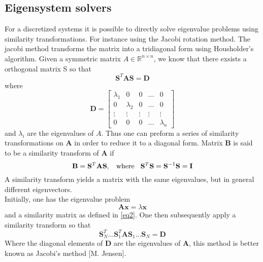 \documentclass[%
reprint,
amsmath,amssymb,
aps,
]{revtex4-1}
\begin{document}
\subsection*{Eigensystem solvers} \noindent 
For a discretized systems it is possible to directly solve eigenvalue problems using similarity transformations. For instance using the Jacobi rotation method. The jacobi method transforms the matrix into a tridiagonal form using Housholder's algorithm. Given a symmetric matrix $A\in \mathbb{R}^{n\times n}$, we know that there exsists a orthogonal matrix S so that 
\begin{equation*}
	\mathbf{S}^T\mathbf{A}\mathbf{S} = \mathbf{D}
\end{equation*}
where 
\begin{equation*}
	\mathbf{D} = \begin{bmatrix}
	\lambda_1 & 0 & 0 & \dots & 0 \\
	0 & \lambda_2 & 0 & \dots & 0 \\
	\vdots & \vdots & \vdots &\vdots&\vdots\\
	0 & 0 & 0 &\dots & \lambda_n
	\end{bmatrix}
\end{equation*}
and $\lambda_i$ are the eigenvalues of $A$. Thus one can preform a series of similarity transformations on $\mathbf{A}$ in order to reduce it to a diagonal form. Matrix $\mathbf{B}$ is said to be a similarity transform of $\mathbf{A}$ if 
\begin{equation} \label{eq2}
	\mathbf{B} = \mathbf{S}^T\mathbf{A}\mathbf{S}, \hspace{3mm} \textnormal{where} \hspace{3mm} \mathbf{S}^T\mathbf{S} = \mathbf{S}^{-1}\mathbf{S} = \mathbf{I}
\end{equation}
A similarity transform yields a matrix with the same eigenvalues, but in general different eigenvectors. \\
Initially, one has the eigenvalue problem 
\begin{equation}
	\mathbf{A}\mathbf{x} = \lambda\mathbf{x}
\end{equation}
and a similarity matrix as defined in \ref{eq2}. One then subsequently apply a similarity transform so that 
\begin{equation}
	\mathbf{S}_N^T...\mathbf{S}_1^T\mathbf{A}\mathbf{S}_1...\mathbf{S}_N = \mathbf{D}
\end{equation}
Where the diagonal elements of $\mathbf{D}$ are the eigenvalues of $\mathbf{A}$, this method is better known as Jacobi's method [M. Jensen].
\end{document}
